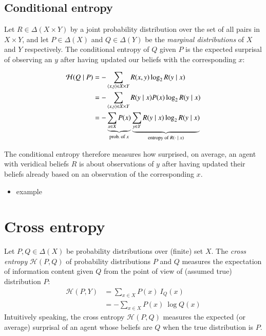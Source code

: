 \documentclass[nobib,nofonts]{tufte-handout}
\begin{document}
\subsection{Conditional entropy}

Let $R \in \Delta(X \times Y)$ by a joint probability distribution over the set of all pairs in $X \times Y$, and let $P \in \Delta(X)$ and $Q \in \Delta(Y)$ be the \emph{marginal distributions} of $X$ and $Y$ respectively.
The conditional entropy of $Q$ given $P$ is the expected surprisal of observing an $y$ after having updated our beliefs with the corresponding $x$:

\begin{align*}
  \mathcal{H}(Q \mid P) & = - \sum_{\left \langle x,y\right\rangle \in X \times Y} R(x,y) \log_{2} R(y \mid x) \\
                        & = - \sum_{\left \langle x,y\right\rangle \in X \times Y} R(y \mid x) P(x) \log_{2} R(y \mid x) \\
                        & = - \underbrace{\sum_{x \in X} P(x)}_{\text{prob.~of $x$}}
                          \underbrace{\sum_{y \in Y} R(y \mid x) \log_{2} R(y \mid x)}_{\text{entropy of $R(\cdot \mid x)$}}
\end{align*}

The conditional entropy therefore measures how surprised, on average, an agent with veridical beliefs $R$ is about observations of $y$ after having updated their beliefs already based on an observation of the corresponding $x$.

\begin{itemize}
  \item example
\end{itemize}

\section{Cross entropy}

Let $P, Q \in \Delta(X)$ be probability distributions over (finite) set $X$.
The \emph{cross entropy} $\mathcal{H}(P,Q)$ of probability distributions $P$ and $Q$ measures the expectation of information content given $Q$ from the point of view of (assumed true) distribution $P$:
\begin{align*}
  \mathcal{H}(P,Y) & = \sum_{x \in X} P(x) \ I_{Q}(x) \\
                   & = - \sum_{x \in X} P(x) \ \log Q(x)
\end{align*}
Intuitively speaking, the cross entropy $\mathcal{H}(P,Q)$ measures the expected (or average) surprisal of an agent whose beliefs are $Q$ when the true distribution is $P$.
\end{document}
